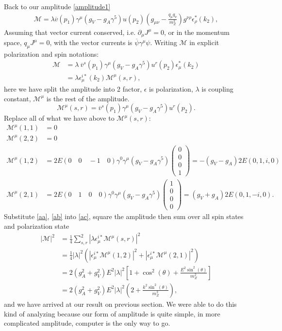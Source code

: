 \documentclass{report}
\newcommand{\nn}{\nonumber}
\numberwithin{equation}{section}
\begin{document}
Back to our amplitude \eqref{amplitude1}
\begin{align}
\mathcal{M}=\lambda \overline{v}(p_1)\gamma^\mu (g_V-g_A\gamma^5) u(p_2) \left(g_{\mu \nu}-\frac{q_\mu q_\nu}{m_Z^2}\right) g^{\nu \rho}\epsilon_\rho^*(k_2),
\end{align}
Assuming that vector current conserved, i.e. $\partial_\mu J^\mu=0$, or in the momentum space, $q_\mu J^\mu=0$, with the vector currents is $\overline{\psi}\gamma^\mu\psi$. Writing $\mathcal{M}$ in explicit polarization and spin notations:
\begin{align}\label{ac}
\mathcal{M}&=\lambda\ \overline{v}^s(p_1)\gamma^\mu (g_V-g_A \gamma^5) u^r(p_2)  \epsilon_\mu^*(k_2)\nn\\
&=\lambda \epsilon^{i*}_\mu(k_2) \mathcal{M}^\mu(s,r),
\end{align}
here we have split the amplitude into 2 factor, $\epsilon$ is polarization, $\lambda$ is coupling constant, $\mathcal{M}^\mu$ is the rest of the amplitude.
\begin{equation}
\mathcal{M}^\mu(s,r)=\overline{v}^s(p_1)\gamma^\mu (g_V-g_A \gamma^5) u^r(p_2) .
\end{equation}
Replace all of what we have above to $\mathcal{M}^\mu(s,r)$:
\begin{align}\label{ab}
\mathcal{M}^\mu(1,1)&=0\nn\\
\mathcal{M}^\mu(2,2)&=0\nn\\
\mathcal{M}^\mu(1,2)&=2E(0\quad 0\quad-1\quad0)\gamma^0\gamma^\mu(g_V-g_A\gamma^5) \begin{pmatrix}
0\\0\\0\\1
\end{pmatrix}=-(g_V-g_A)2E(0,1,i,0)\nn\\
\mathcal{M}^\mu(2,1)&=2E(0\quad 1\quad 0\quad 0)\gamma^0\gamma^\mu(g_V-g_A\gamma^5) \begin{pmatrix}
1\\0\\0\\0
\end{pmatrix}=(g_V+g_A)2E(0,1,-i,0).
\end{align}
Substitute \eqref{aa}, \eqref{ab} into \eqref{ac}, square the amplitude then sum over all spin states and polarization state
\begin{align}
|\mathcal{M}|^2&=\frac{1}{4}\sum_{s,r}^2|\lambda \epsilon^{i*}_\mu \mathcal{M}^\mu(s,r)|^2\nn\\
&=\frac{1}{4}|\lambda|^2\left(| \epsilon^{i*}_\mu \mathcal{M}^\mu(1,2)|^2+|\epsilon^{i*}_\mu\mathcal{M}^\mu(2,1)|^2\right)\nn\\
&= 2(g_A^2+g_V^2)E^2|\lambda|^2 \left[1+\cos^2(\theta)+\frac{E^2 \sin^2(\theta)}{m_Z^2}\right]\nn\\
&=2 (g_A^2+g_V^2)E^2|\lambda|^2 \left(2+\frac{k^2 \sin^2(\theta)}{m_Z^2}\right),
\end{align}
and we have arrived at our result on previous section. We were able to do this kind of analyzing because our form of amplitude is quite simple, in more complicated amplitude, computer is the only way to go.
\end{document}
